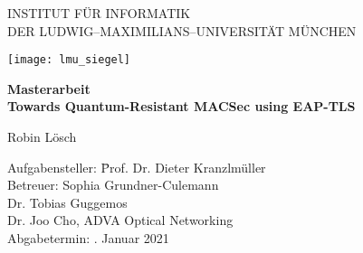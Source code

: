 \begin{center}

\vspace*{-2cm}

{\Huge INSTITUT FÜR INFORMATIK\\[1mm]}
DER LUDWIG--MAXIMILIANS--UNIVERSITÄT MÜNCHEN\\

\vspace*{1cm}

\texttt{[image: lmu\_siegel]}

\vspace*{2cm}

{\Large \textbf{Masterarbeit}}\\ %

\vspace{2.0cm}
{\Huge \textbf{Towards Quantum-Resistant MACSec using EAP-TLS}}\\

\vspace{1.5cm}

{\LARGE Robin Lösch} %
\vspace{2cm}

\parbox{1cm}{
\begin{large}
\begin{tabbing}
Aufgabensteller: \hspace{.5cm} \=Prof. Dr. Dieter Kranzlmüller\\[2mm]
Betreuer:
\>Sophia Grundner-Culemann\\
\>Dr. Tobias Guggemos\\
\>Dr. Joo Cho, ADVA Optical Networking\\[5mm]
Abgabetermin: . Januar 2021\\
\end{tabbing}
\end{large}}\\
\vspace{5mm}

\end{center}
